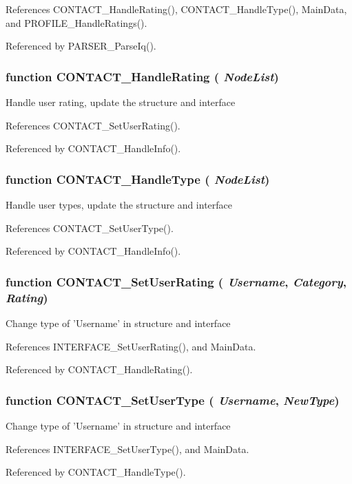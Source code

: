 References CONTACT\_\-HandleRating(), CONTACT\_\-HandleType(), MainData, and PROFILE\_\-HandleRatings().

Referenced by PARSER\_\-ParseIq().
\subsubsection{\setlength{\rightskip}{0pt plus 5cm}function CONTACT\_\-HandleRating ( {\em NodeList})}\label{info_8js_8eed364d5c5d3be5d928ae50c6952823}


Handle user rating, update the structure and interface 

References CONTACT\_\-SetUserRating().

Referenced by CONTACT\_\-HandleInfo().
\subsubsection{\setlength{\rightskip}{0pt plus 5cm}function CONTACT\_\-HandleType ( {\em NodeList})}\label{info_8js_47b4166f6a379fd6415d47a9d777cca5}


Handle user types, update the structure and interface 

References CONTACT\_\-SetUserType().

Referenced by CONTACT\_\-HandleInfo().
\subsubsection{\setlength{\rightskip}{0pt plus 5cm}function CONTACT\_\-SetUserRating ( {\em Username}, \/   {\em Category}, \/   {\em Rating})}\label{info_8js_cfe04b0f835f6bf6c8e46a7bc6f7f688}


Change type of 'Username' in structure and interface 

References INTERFACE\_\-SetUserRating(), and MainData.

Referenced by CONTACT\_\-HandleRating().
\subsubsection{\setlength{\rightskip}{0pt plus 5cm}function CONTACT\_\-SetUserType ( {\em Username}, \/   {\em NewType})}\label{info_8js_4aa77385acda3e8efe17f6f033bd83a3}


Change type of 'Username' in structure and interface 

References INTERFACE\_\-SetUserType(), and MainData.

Referenced by CONTACT\_\-HandleType().
